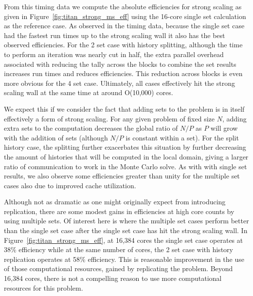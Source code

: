 From this timing data we compute the absolute efficiencies for strong
scaling as given in Figure~\ref{fig:titan_strong_ms_eff} using the
16-core single set calculation as the reference case. As observed in
the timing data, because the single set case had the fastest run times
up to the strong scaling wall it also has the best observed
efficiencies. For the 2 set case with history splitting, although the
time to perform an iteration was nearly cut in half, the extra
parallel overhead associated with reducing the tally across the blocks
to combine the set results increases run times and reduces
efficiencies. This reduction across blocks is even more obvious for
the 4 set case. Ultimately, all cases effectively hit the strong
scaling wall at the same time at around O(10,000) cores.

We expect this if we consider the fact that adding sets to the problem
is in itself effectively a form of strong scaling. For any given
problem of fixed size $N$, adding extra sets to the computation
decreases the global ratio of $N/P$ as $P$ will grow with the addition
of sets (although $N/P$ is constant within a set). For the split
history case, the splitting further exacerbates this situation by
further decreasing the amount of histories that will be computed in
the local domain, giving a larger ratio of communication to work in
the Monte Carlo solve. As with with single set results, we also
observe some efficiencies greater than unity for the multiple set
cases also due to improved cache utilization. 

Although not as dramatic as one might originally expect from
introducing replication, there are some modest gains in efficiencies
at high core counts by using multiple sets. Of interest here is where
the multiple set cases perform better than the single set case after
the single set case has hit the strong scaling wall. In
Figure~\ref{fig:titan_strong_ms_eff}, at 16,384 cores the single set
case operates at 38\% efficiency while at the same number of cores,
the 2 set case with history replication operates at 58\%
efficiency. This is reasonable improvement in the use of those
computational resources, gained by replicating the problem. Beyond
16,384 cores, there is not a compelling reason to use more
computational resources for this problem.

